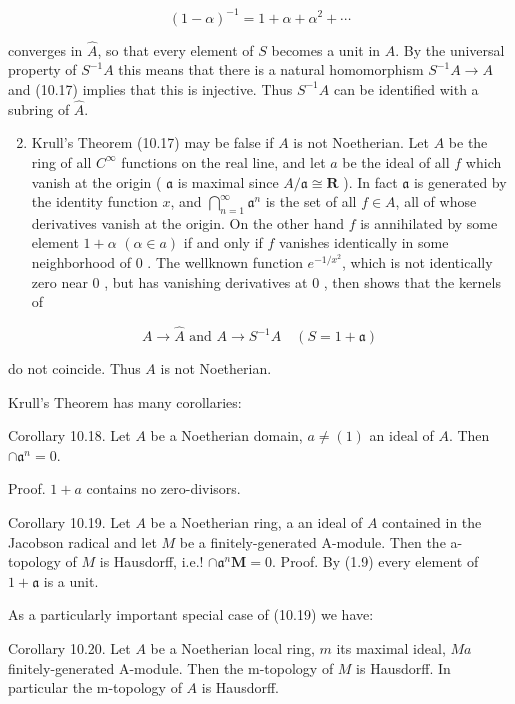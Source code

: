 \documentclass{standalone}
\theoremstyle{definition}
\theoremstyle{remark}
\begin{document}
\[
(1-\alpha)^{-1}=1+\alpha+\alpha^{2}+\cdots
\]

converges in $\hat{A}$, so that every element of $S$ becomes a unit in $\hat{A}$. By the universal property of $S^{-1} A$ this means that there is a natural homomorphism $S^{-1} A \rightarrow A$ and (10.17) implies that this is injective. Thus $S^{-1} A$ can be identified with a subring of $\hat{A}$.

\begin{enumerate}
  \setcounter{enumi}{1}
  \item Krull's Theorem (10.17) may be false if $A$ is not Noetherian. Let $A$ be the ring of all $C^{\infty}$ functions on the real line, and let $a$ be the ideal of all $f$ which vanish at the origin ( $\mathfrak{a}$ is maximal since $A / \mathfrak{a} \cong \mathbf{R}$ ). In fact $\mathfrak{a}$ is generated by the identity function $x$, and $\bigcap_{n=1}^{\infty} \mathfrak{a}^{n}$ is the set of all $f \in A$, all of whose derivatives vanish at the origin. On the other hand $f$ is annihilated by some element $1+\alpha$ $(\alpha \in a)$ if and only if $f$ vanishes identically in some neighborhood of 0 . The wellknown function $e^{-1 / x^{2}}$, which is not identically zero near 0 , but has vanishing derivatives at 0 , then shows that the kernels of
\end{enumerate}

\[
A \rightarrow \hat{A} \text { and } A \rightarrow S^{-1} A \quad(S=1+\mathfrak{a})
\]

do not coincide. Thus $A$ is not Noetherian.

Krull's Theorem has many corollaries:

Corollary 10.18. Let $A$ be a Noetherian domain, $a \neq(1)$ an ideal of $A$. Then $\cap \mathfrak{a}^{n}=0$.

Proof. $1+a$ contains no zero-divisors.

Corollary 10.19. Let $A$ be a Noetherian ring, a an ideal of $A$ contained in the Jacobson radical and let $M$ be a finitely-generated A-module. Then the a-topology of $M$ is Hausdorff, i.e.! $\cap \mathfrak{a}^{n} \boldsymbol{M}=0$. Proof. By (1.9) every element of $1+\mathfrak{a}$ is a unit.

As a particularly important special case of (10.19) we have:

Corollary 10.20. Let $A$ be a Noetherian local ring, $m$ its maximal ideal, $M a$ finitely-generated A-module. Then the m-topology of $M$ is Hausdorff. In particular the m-topology of $A$ is Hausdorff.
\end{document}
